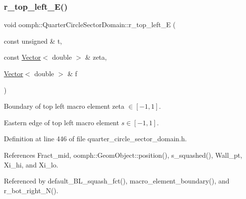 \mbox{\label{classoomph_1_1QuarterCircleSectorDomain_a951bc38c7e96a40f33c60b3ccee820bf}} 
\subsubsection{\texorpdfstring{r\+\_\+top\+\_\+left\+\_\+\+E()}{r\_top\_left\_E()}}
{\footnotesize\ttfamily void oomph\+::\+Quarter\+Circle\+Sector\+Domain\+::r\+\_\+top\+\_\+left\+\_\+E (\begin{DoxyParamCaption}\item[{const unsigned \&}]{t,  }\item[{const \hyperlink{classoomph_1_1Vector}{Vector}$<$ double $>$ \&}]{zeta,  }\item[{\hyperlink{classoomph_1_1Vector}{Vector}$<$ double $>$ \&}]{f }\end{DoxyParamCaption})\hspace{0.3cm}{\ttfamily [private]}}



Boundary of top left macro element zeta $ \in [-1,1] $. 

Eastern edge of top left macro element $ s \in [-1,1] $. 

Definition at line 446 of file quarter\+\_\+circle\+\_\+sector\+\_\+domain.\+h.



References Fract\+\_\+mid, oomph\+::\+Geom\+Object\+::position(), s\+\_\+squashed(), Wall\+\_\+pt, Xi\+\_\+hi, and Xi\+\_\+lo.



Referenced by default\+\_\+\+B\+L\+\_\+squash\+\_\+fct(), macro\+\_\+element\+\_\+boundary(), and r\+\_\+bot\+\_\+right\+\_\+\+N().

\mbox{\label{classoomph_1_1QuarterCircleSectorDomain_af1520e712b46c8e1b0f098596fa63101}} 
